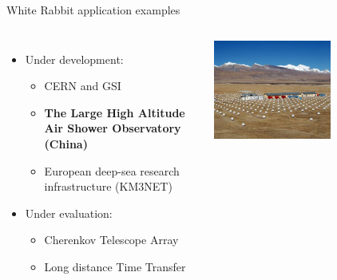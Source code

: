 \documentclass[compress, red]{beamer}
\begin{document}
\begin{frame}{White Rabbit application examples}
\begin{columns}[c]
    \begin{itemize}
      \item Under development:
      \begin{itemize}
	\item CERN and GSI
	\item \textbf{The Large High Altitude Air Shower Observatory (China)}
	\item European deep-sea research infrastructure (KM3NET) 
      \end{itemize}         	
      \item Under evaluation:
      \begin{itemize}
	\item Cherenkov Telescope Array
	\item Long distance Time Transfer
      \end{itemize}         	
    \end{itemize}    
    \begin{center}
      \includegraphics[width=0.6\textwidth]{../../figures/applications/lhaaso.pdf}
      \end{center}
\end{columns}
\end{frame}
\end{document}
